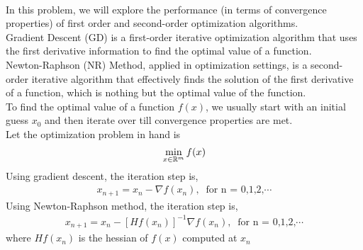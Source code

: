 \\
In this problem, we will explore the performance (in terms of convergence properties) of first order and second-order optimization algorithms. \\
Gradient Descent (GD) is a first-order iterative optimization algorithm that uses the first derivative information to find the optimal value of a function.\\
Newton-Raphson (NR) Method, applied in optimization settings, is a second-order iterative algorithm that effectively finds the solution of the first derivative of a function, which is nothing but the optimal value of the function.\\

To find the optimal value of a function $f(x)$, we usually start with an initial guess $x_0$ and then iterate over till convergence properties are met.\\
Let the optimization problem in hand is 
\[
\min_{x \in \mathbb{R}^{m}} f(x)\\
\]
Using gradient descent, the iteration step is,
\begin{align*}
    x_{n+1} = x_n - \nabla f(x_n),\;\;\text{for n = 0,1,2,$\cdots$}
\end{align*}
Using Newton-Raphson method, the iteration step is,\\
\begin{align*}
    x_{n+1} = x_n - {[Hf(x_n)]}^{-1}\nabla f(x_n),\;\;\text{for n = 0,1,2,$\cdots$}
\end{align*}
where $Hf(x_n)$ is the hessian of $f(x)$ computed at $x_n$

